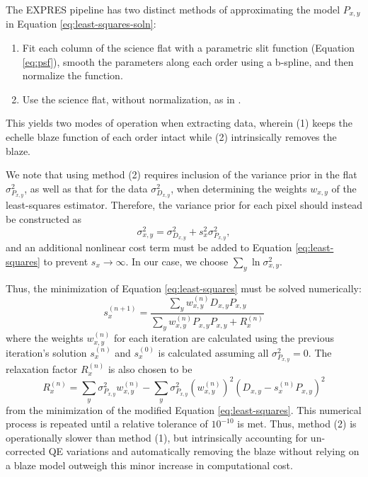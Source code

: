 The EXPRES pipeline has two distinct methods of approximating the model $P_{x,y}$ in Equation \ref{eq:least-squares-soln}:
\begin{enumerate}
    \item Fit each column of the science flat with a parametric slit function (Equation \ref{eq:psf}), smooth the parameters along each order using a b-spline, and then normalize the function.
    \item Use the science flat, without normalization, as in \citet{zechmeister_flat-relative_2014}.
\end{enumerate}
This yields two modes of operation when extracting data, wherein (1) keeps the echelle blaze function of each order intact while (2) intrinsically removes the blaze.

We note that using method (2) requires inclusion of the variance prior in the flat \(\sigma_{P_{x,y}}^2\), as well as that for the data \(\sigma_{D_{x,y}}^2\), when determining the weights \(w_{x,y}\) of the least-squares estimator. Therefore, the variance prior for each pixel should instead be constructed as
\begin{equation}
    \sigma^2_{x,y} = \sigma^2_{D_{x,y}} + s^2_x \sigma^2_{P_{x,y}},
\end{equation}
and an additional nonlinear cost term must be added to Equation \ref{eq:least-squares} to prevent $s_x \rightarrow \infty$. In our case, we choose \(\sum_y \ln{\sigma^2_{x,y}}\).

Thus, the minimization of Equation \ref{eq:least-squares} must be solved numerically:
\begin{equation}
    s_x^{(n+1)} = \frac{\sum_y{ w^{(n)}_{x,y} D_{x,y} P_{x,y}  }}{\sum_y{ w^{(n)}_{x,y} P_{x,y} P_{x,y}} + R^{(n)}_x}
    \label{eq:numerical-soln}
\end{equation}
where the weights $w^{(n)}_{x,y}$ for each iteration are calculated using the previous iteration's solution $s^{(n)}_x$ and $s^{(0)}_x$ is calculated assuming all $\sigma^2_{P_{x,y}} = 0$. The relaxation factor $R^{(n)}_x$ is also chosen to be
\begin{equation}
    R^{(n)}_x = \sum_y \sigma^2_{P_{x,y}} w^{(n)}_{x,y} - \sum_y \sigma^2_{P_{x,y}} \left( w^{(n)}_{x,y} \right)^2 \left( D_{x,y} - s_x^{(n)} P_{x,y} \right)^2
    \label{eq:relaxation}
\end{equation}
from the minimization of the modified Equation \ref{eq:least-squares}. This numerical process is repeated until a relative tolerance of $10^{-10}$ is met. Thus, method (2) is operationally slower than method (1), but intrinsically accounting for un-corrected QE variations and automatically removing the blaze without relying on a blaze model outweigh this minor increase in computational cost.

